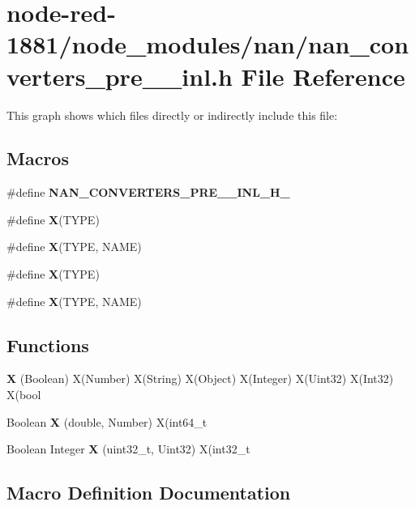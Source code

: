 \section{node-\/red-\/1881/node\+\_\+modules/nan/nan\+\_\+converters\+\_\+pre\+\_\+\_\+inl.h File Reference}
\label{nan__converters__pre__43__inl_8h}
This graph shows which files directly or indirectly include this file\+:
\subsection*{Macros}
\begin{DoxyCompactItemize}
\item 
\#define \textbf{ N\+A\+N\+\_\+\+C\+O\+N\+V\+E\+R\+T\+E\+R\+S\+\_\+\+P\+R\+E\+\_\+\_\+\+I\+N\+L\+\_\+\+H\+\_\+}
\item 
\#define \textbf{ X}(T\+Y\+PE)
\item 
\#define \textbf{ X}(T\+Y\+PE,  N\+A\+ME)
\item 
\#define \textbf{ X}(T\+Y\+PE)
\item 
\#define \textbf{ X}(T\+Y\+PE,  N\+A\+ME)
\end{DoxyCompactItemize}
\subsection*{Functions}
\begin{DoxyCompactItemize}
\item 
\textbf{ X} (Boolean) X(Number) X(String) X(Object) X(Integer) X(Uint32) X(Int32) X(bool
\item 
Boolean \textbf{ X} (double, Number) X(int64\+\_\+t
\item 
Boolean Integer \textbf{ X} (uint32\+\_\+t, Uint32) X(int32\+\_\+t
\end{DoxyCompactItemize}


\subsection{Macro Definition Documentation}
\mbox{\label{nan_8h_a48975470272ecfc0c0a6c728ba5b2d78}} 
